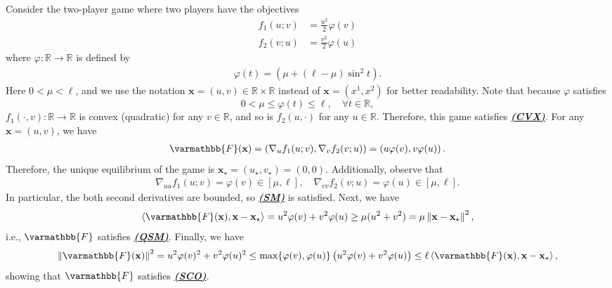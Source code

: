 \documentclass{article}
\newcommand{\vx}{{\mathbf{x}}}
\newcommand{\reals}{\mathbb{R}}
\newcommand{\opF}{{\varmathbb{F}}}
\newcommand{\inprod}[2]{\left\langle #1,#2 \right\rangle}
\newcommand{\sqnorm}[1]{\left\| #1 \right\|^2}
\theoremstyle{plain}
\theoremstyle{remark}
\begin{document}
Consider the two-player game where two players have the objectives
\begin{align*}
    f_1 (u;v) & = \frac{u^2}{2} \varphi(v) \\
    f_2 (v;u) & = \frac{v^2}{2} \varphi(u)
\end{align*}
where $\varphi\colon \reals \to \reals$ is defined by
\begin{align*}
    \varphi(t) = \left( \mu + (\ell - \mu) \sin^2 t \right) .
\end{align*}
Here $0 < \mu < \ell$, and we use the notation $\vx = (u,v) \in \reals \times \reals$ instead of $\vx = (x^1, x^2)$ for better readability.
Note that because $\varphi$ satisfies
\[
    0 < \mu \le \varphi(t) \le \ell , \quad \forall t \in \reals ,
\]
$f_1(\cdot, v) \colon \reals \to \reals$ is convex (quadratic) for any $v \in \reals$, and so is $f_2(u, \cdot)$ for any $u \in \reals$.
Therefore, this game satisfies \hyperref[assumption:convexity]{\textbf{\emph{(CVX)}}}.
For any $\vx = (u,v)$, we have
\begin{align*}
    \opF(\vx) = \left( \nabla_u f_1(u;v) , \nabla_v f_2(v;u) \right) = \left( u\varphi(v) , v\varphi(u) \right) .
\end{align*}
Therefore, the unique equilibrium of the game is $\vx_\star = (u_\star, v_\star) = (0, 0)$.
Additionally, observe that
\begin{align*}
    \nabla_{uu} f_1(u;v) = \varphi (v) \in [\mu, \ell] , \quad \nabla_{vv} f_2(v;u) = \varphi (u) \in [\mu, \ell] .
\end{align*}
In particular, the both second derivatives are bounded, so \hyperref[assumption:smoothness]{\textbf{\emph{(SM)}}} is satisfied.
Next, we have
\begin{align*}
    \inprod{\opF(\vx)}{\vx - \vx_\star} = u^2 \varphi(v) + v^2 \varphi(u) \ge \mu (u^2 + v^2) = \mu \sqnorm{\vx - \vx_\star} ,
\end{align*}
i.e., $\opF$ satisfies \hyperref[assumption:quasi-strong-monotonicity]{\textbf{\emph{(QSM)}}}.
Finally, we have
\begin{align*}
    \sqnorm{\opF(\vx)} = u^2 \varphi(v)^2 + v^2 \varphi(u)^2 \le \max\{ \varphi(v), \varphi(u) \} \left( u^2 \varphi(v) + v^2 \varphi(u) \right)\le \ell \inprod{\opF(\vx)}{\vx - \vx_\star} ,
\end{align*}
showing that $\opF$ satisfies \hyperref[assumption:star-cocoercivity]{\textbf{\emph{(SCO)}}}.
\end{document}
